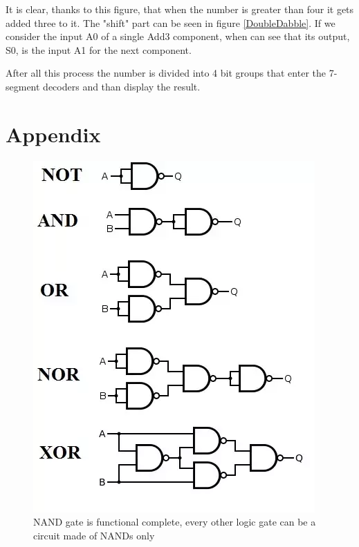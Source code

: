 \documentclass{article}
\begin{document}
It is clear, thanks to this figure, that when the number is greater than four it gets added three to it. The "shift" part can be seen in figure \ref{DoubleDabble}. If we consider the input A0 of a single Add3 component, when can see that its output, S0, is the input A1 for the next component.

After all this process the number is divided into 4 bit groups that enter the 7-segment decoders and than display the result.






\clearpage
\section{Appendix}

\begin{figure}[h]
    \centering
    \includegraphics[scale=.42]{IM_NAND_allpowerful.png}
    \caption{NAND gate is functional complete, every other logic gate can be a circuit made of NANDs only}
    \label{NAND_allpowerful}
\end{figure}
\end{document}
